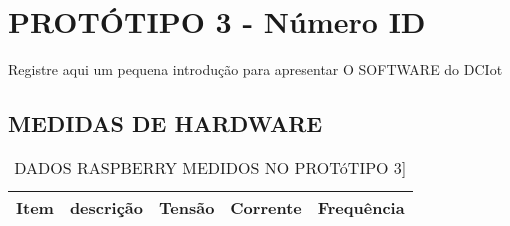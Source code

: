 \section{PROTÓTIPO 3 - Número ID}
Registre aqui um pequena introdução para apresentar O SOFTWARE do DCIot
\subsection{MEDIDAS DE HARDWARE}

\begin{table}
	\centering
	\caption{DADOS RASPBERRY MEDIDOS NO PROTóTIPO 3]}
	\begin{tabular}{ |c | p{3cm}| p{3cm} |p{3cm} | p{3cm} | } \hline
		\textbf{ Item} 	   & \textbf{descrição}	&\textbf{Tensão} &\textbf{Corrente} &\textbf{Frequência} \\ \hline
		

\end{tabular}
\end{table}
